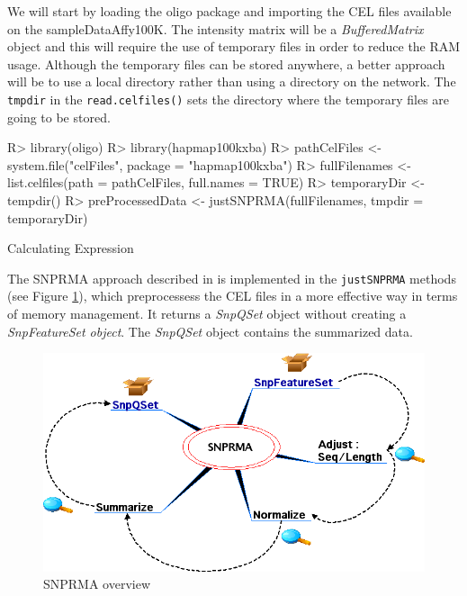 \documentclass{article}
\newcommand{\Rfunction}[1]{{\texttt{#1}}}
\newcommand{\Rmethod}[1]{{\texttt{#1}}}
\newcommand{\Robject}[1]{{\texttt{#1}}}
\newcommand{\Rpackage}[1]{{\textsf{#1}}}
\newcommand{\Rclass}[1]{{\textit{#1}}}
\newcommand{\oligo}{\Rpackage{oligo }}
\begin{document}
We will start by loading the \oligo package and importing the CEL
files available on the \Rpackage{sampleDataAffy100K}. The intensity
matrix will be a \Rclass{BufferedMatrix} object and this will require
the use of temporary files in order to reduce the RAM usage. Although
the temporary files can be stored anywhere, a better approach will be
to use a local directory rather than using a directory on the
network. The \Robject{tmpdir} in the \Rfunction{read.celfiles()} sets
the directory where the temporary files are going to be stored.

\begin{Schunk}
\begin{Sinput}
R> library(oligo)
R> library(hapmap100kxba)
R> pathCelFiles <- system.file("celFiles", package = "hapmap100kxba")
R> fullFilenames <- list.celfiles(path = pathCelFiles, 
     full.names = TRUE)
R> temporaryDir <- tempdir()
R> preProcessedData <- justSNPRMA(fullFilenames, 
     tmpdir = temporaryDir)
\end{Sinput}
\begin{Soutput}
Calculating Expression
\end{Soutput}
\end{Schunk}

The SNPRMA approach described in \cite{Carvalho2006} is implemented in the
\Rmethod{justSNPRMA} methods (see Figure \ref{snprma}), which
preprocessess the CEL files in a more effective way in terms of memory
management. It returns a \Rclass{SnpQSet} object without creating a
\Rclass{SnpFeatureSet object}. The \Rclass{SnpQSet} object contains
the summarized data.

\begin{figure}[h]
  \centering
  \includegraphics[scale=.5]{snprma.png}
  \caption{SNPRMA overview}
  \label{snprma}
\end{figure}
\end{document}
